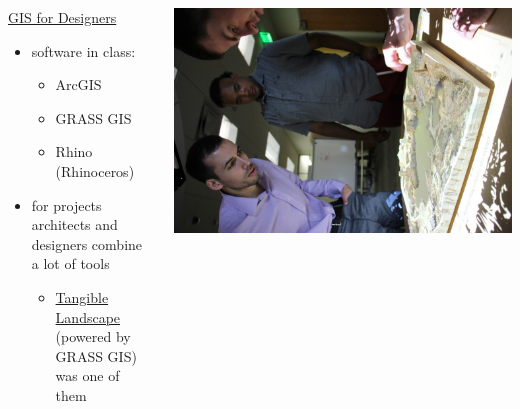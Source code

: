 \documentclass[xcolor={dvipsnames,usenames},beamer]{beamer}
\begin{document}
\begin{frame}{\coursesTitle}


\begin{columns}[c]


\begin{block}{\href{http://courses.ncsu.edu/lar582/common/}%
  {GIS for Designers}}
\begin{itemize}
 \item software in class:
 \begin{itemize}
  \item ArcGIS
  \item GRASS GIS
  \item Rhino (Rhinoceros)
 \end{itemize}
 \item for projects architects and designers combine a lot of tools
 \begin{itemize}
  \item \href{http://geospatial.ncsu.edu/osgeorel/tangible-landscape.html}{Tangible Landscape}
    (powered by GRASS GIS) was one of them
 \end{itemize}

\end{itemize}

\end{block}


\href{https://www.lib.ncsu.edu/stories/re-imagining-lake-raleigh-woods}{%
\includegraphics[width=\textwidth]{./images/edu/designers}%
}

\end{columns}

\end{frame}
\end{document}
